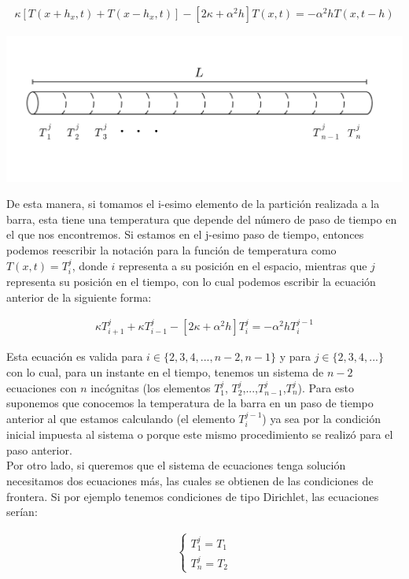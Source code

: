 \documentclass[12pt]{article}
\begin{document}
\begin{align*}
    \kappa[T(x+h_x,t) + T(x-h_x,t)] - [2\kappa + \alpha^2 h]T(x,t) = -\alpha^2 h T(x,t-h)
\end{align*}

\begin{center}
    \includegraphics[width=1\linewidth]{Division.png}
\end{center}

De esta manera, si tomamos el i-esimo elemento de la partición realizada a la barra, esta tiene una temperatura que depende del número de paso de tiempo en el que nos encontremos. Si estamos en el j-esimo paso de tiempo, entonces podemos reescribir la notación para la función de temperatura como $T(x,t) = T_i^j$, donde $i$ representa a su posición en el espacio, mientras que $j$ representa su posición en el tiempo, con lo cual podemos escribir la ecuación anterior de la siguiente forma:

\begin{align}
    \kappa T_{i+1}^j + \kappa T_{i-1}^j - [2\kappa + \alpha^2 h]T_i^j = -\alpha^2 h T_i^{j-1}
\end{align}

Esta ecuación es valida para $i \in \{2,3,4,...,n-2,n-1\}$ y para $j \in \{ 2,3,4,... \}$ con lo cual, para un instante en el tiempo, tenemos un sistema de $n-2$ ecuaciones con $n$ incógnitas (los elementos $T_1^j$, $T_2^j$,...,$T_{n-1}^j$,$T_n^j$). Para esto suponemos que conocemos la temperatura de la barra en un paso de tiempo anterior al que estamos calculando (el elemento $T_i^{j-1}$) ya sea por la condición inicial impuesta al sistema o porque este mismo procedimiento se realizó para el paso anterior. \\

Por otro lado, si queremos que el sistema de ecuaciones tenga solución necesitamos dos ecuaciones más, las cuales se obtienen de las condiciones de frontera. Si por ejemplo tenemos condiciones de tipo Dirichlet, las ecuaciones serían:

\begin{align}
    \begin{cases}
        T_1^j = T_1\\
        T_n^j = T_2
    \end{cases}
\end{align}
\end{document}
